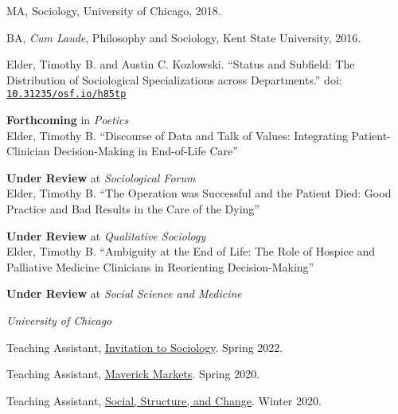\documentclass[11pt,article,oneside]{memoir}
\begin{document}
\ind MA, Sociology, University of Chicago, 2018.

\ind BA, \emph{Cum Laude}, Philosophy and Sociology, Kent State University, 2016. \vspace{0.1in}

\bigskip


\ind Elder, Timothy B. and Austin C. Kozlowski. ``Status and Subfield: The Distribution of Sociological Specializations across Departments.'' doi: \texttt{\href{https://osf.io/preprints/socarxiv/h85tp/}{10.31235/osf.io/h85tp}} \\
	\strut\hspace{0.4in} \footnotesize \textbf{Forthcoming} in \textit{Poetics} \normalsize \\

\ind Elder, Timothy B. ``Discourse of Data and Talk of Values: Integrating Patient-Clinician Decision-Making in End-of-Life Care'' \\
	\strut\hspace{0.4in} \footnotesize \textbf{Under Review} at \textit{Sociological Forum} \normalsize \\

\ind Elder, Timothy B. ``The Operation was Successful and the Patient Died: Good Practice and Bad Results in the Care of the Dying'' \\
	\strut\hspace{0.4in} \footnotesize \textbf{Under Review} at \textit{Qualitative Sociology} \normalsize \\

\ind Elder, Timothy B. ``Ambiguity at the End of Life: The Role of Hospice and Palliative Medicine Clinicians in Reorienting Decision-Making'' \\
	\strut\hspace{0.4in} \footnotesize \textbf{Under Review} at \textit{Social Science and Medicine} \normalsize \\

\bigskip

\medskip
\noindent\emph{University of Chicago \vspace{0.01in}}

\ind Teaching Assistant, \underline{Invitation to Sociology}. Spring 2022.

\ind Teaching Assistant, \underline{Maverick Markets}. Spring 2020.

\ind Teaching Assistant, \underline{Social, Structure, and Change}. Winter 2020.
\end{document}
